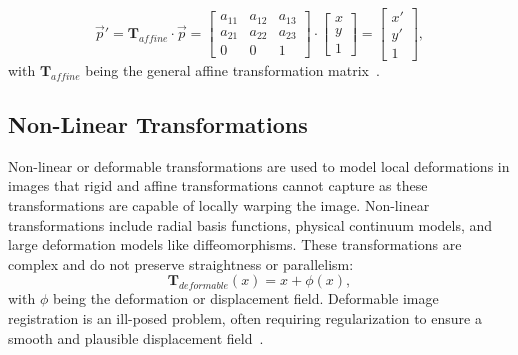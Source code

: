 \documentclass[english,version-2022-01]{uzl-thesis} %
\begin{document}
\begin{equation}
	\overrightarrow{p}' = \mathbf{T}_{affine} \cdot  \overrightarrow{p} = 
	\begin{bmatrix}
		a_{11} & a_{12} & a_{13}\\
		a_{21} & a_{22} & a_{23}\\
		0 & 0 & 1
	\end{bmatrix}
	\cdot
	\begin{bmatrix}
		x\\
		y\\
		1
	\end{bmatrix}
	 = 
	 \begin{bmatrix}
		x'\\
		y'\\
		1
	\end{bmatrix},
\end{equation}
with $\mathbf{T}_{affine}$ being the general affine transformation matrix~\cite{Strittmatter2023}.

\subsection{Non-Linear Transformations}
Non-linear or deformable transformations are used to model local deformations in images that rigid and affine transformations cannot capture as these transformations are capable of locally warping the image. Non-linear transformations include radial basis functions, physical continuum models, and large deformation models like diffeomorphisms. These transformations are complex and do not preserve straightness or parallelism:
\begin{equation}
	\mathbf{T}_{deformable} (x) = x + \phi (x),
\end{equation}
with $\phi$ being the deformation or displacement field. Deformable image registration is an ill-posed problem, often requiring regularization to ensure a smooth and plausible displacement field~\cite{Strittmatter2023}.
\end{document}
